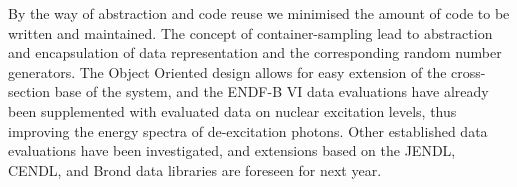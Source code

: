 By the way of abstraction and code reuse we minimised the amount of code to be 
written and 
maintained. The concept of container-sampling lead to abstraction and 
encapsulation of data 
representation and the corresponding random number generators.
The Object Oriented design allows for easy extension of the cross-section base 
of the system, and the
ENDF-B VI data evaluations have already been supplemented with evaluated data 
on nuclear excitation
levels, thus improving the energy spectra of de-excitation photons.
Other established data evaluations have been investigated,
and extensions based on the JENDL\cite{JENDL}, CENDL\cite{CENDL}, and 
Brond\cite{Brond} data 
libraries are foreseen for next year.
